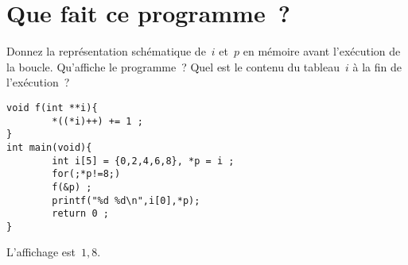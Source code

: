 \section{Que fait ce programme~?}
Donnez la repr\'esentation sch\'ematique de~$i$ et~$p$ en m\'emoire avant 
l'ex\'ecution de la boucle. Qu'affiche le programme~? Quel est le contenu
du tableau~$i$ \`a la fin de l'ex\'ecution~?
\begin{verbatim}
void f(int **i){
        *((*i)++) += 1 ;
}
int main(void){
        int i[5] = {0,2,4,6,8}, *p = i ;
        for(;*p!=8;)
        f(&p) ;
        printf("%d %d\n",i[0],*p);
        return 0 ;
}
\end{verbatim}
\ifcorrection
\begin{correction}
L'affichage est~$1,8$.
\end{correction}
\fi
